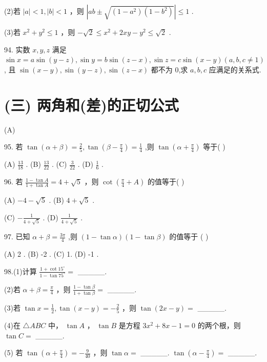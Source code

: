\documentclass[10pt]{article}
\begin{document}
(2)若 \(\left| a\right|  < 1,\left| b\right|  < 1\) ，则 \(\left| {{ab} \pm  \sqrt{\left( {1 - {a}^{2}}\right) \left( {1 - {b}^{2}}\right) }}\right|  \leq  1\) .

(3)若 \({x}^{2} + {y}^{2} \leq  1\) ，则 \(- \sqrt{2} \leq  {x}^{2} + {2xy} - {y}^{2} \leq  \sqrt{2}\) .

94. 实数 \(x,y,z\) 满足 \(\sin x = a\sin \left( {y - z}\right) ,\sin y = b\sin \left( {z - x}\right) ,\sin z = c\sin \left( {x - y}\right) \left( {a,b,c \neq  1}\right)\) , 且 \(\sin \left( {x - y}\right) ,\sin \left( {y - z}\right) ,\sin \left( {z - x}\right)\) 都不为 0,求 \(a,b,c\) 应满足的关系式.

\section*{(三) 两角和(差)的正切公式}

(A)

95. 若 \(\tan \left( {\alpha  + \beta }\right)  = \frac{2}{5},\tan \left( {\beta  - \frac{\pi }{4}}\right)  = \frac{1}{4}\) ,则 \(\tan \left( {\alpha  + \frac{\pi }{4}}\right)\) 等于( )

(A) \(\frac{13}{18}\) . (B) \(\frac{13}{22}\) . (C) \(\frac{3}{22}\) . (D) \(\frac{1}{6}\) .

96. 若 \(\frac{1 - \tan A}{1 + \tan A} = 4 + \sqrt{5}\) ，则 \(\cot \left( {\frac{\pi }{4} + A}\right)\) 的值等于( )

(A) \(- 4 - \sqrt{5}\) . (B) \(4 + \sqrt{5}\) .

(C) \(- \frac{1}{4 + \sqrt{5}}\) . (D) \(\frac{1}{4 + \sqrt{5}}\) .

97. 已知 \(\alpha  + \beta  = \frac{3\pi }{4}\) ,则 \(\left( {1 - \tan \alpha }\right) \left( {1 - \tan \beta }\right)\) 的值等于 ( )

(A) 2 . (B) -2 . (C) 1. (D) -1 .

98.(1)计算 \(\frac{1 + \cot {15}^{ \circ  }}{1 - \tan {75}^{ \circ  }} =\) \_\_\_\_\_.

(2)若 \(\alpha  + \beta  = \frac{\pi }{4}\) ，则 \(\frac{1 - \tan \beta }{1 + \tan \beta } =\) \_\_\_\_\_.

(3)若 \(\tan x = \frac{1}{2},\tan \left( {x - y}\right)  =  - \frac{2}{5}\) ，则 \(\tan \left( {{2x} - y}\right)  =\) \_\_\_\_\_.

(4)在 \(\bigtriangleup  {ABC}\) 中， \(\tan A\) ， \(\tan B\) 是方程 \(3{x}^{2} + {8x} - 1 = 0\) 的两个根，则 \(\tan C =\) \_\_\_\_\_.

(5) 若 \(\tan \left( {\alpha  + \frac{\pi }{4}}\right)  =  - \frac{9}{40}\) ，则 \(\tan \alpha  =\) \_\_\_\_\_. \(\tan \left( {\alpha  - \frac{\pi }{4}}\right)  =\) \_\_\_\_\_.
\end{document}
